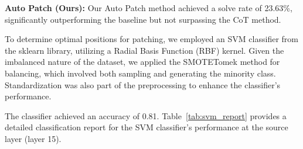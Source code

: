 \documentclass[11pt]{article}
\begin{document}
\textbf{Auto Patch (Ours):} Our Auto Patch method achieved a solve rate of 23.63\%, significantly outperforming the baseline but not surpassing the CoT method.

To determine optimal positions for patching, we employed an SVM classifier from the sklearn library, utilizing a Radial Basis Function (RBF) kernel. Given the imbalanced nature of the dataset, we applied the SMOTETomek method for balancing, which involved both sampling and generating the minority class. Standardization was also part of the preprocessing to enhance the classifier's performance.

The classifier achieved an accuracy of 0.81. Table~\ref{tab:svm_report} provides a detailed classification report for the SVM classifier's performance at the source layer (layer 15).

\begin{table}[h!]
    \centering
    \caption{Classification Report for the classifier}
    \label{tab:svm_report}
\end{table}
\end{document}
